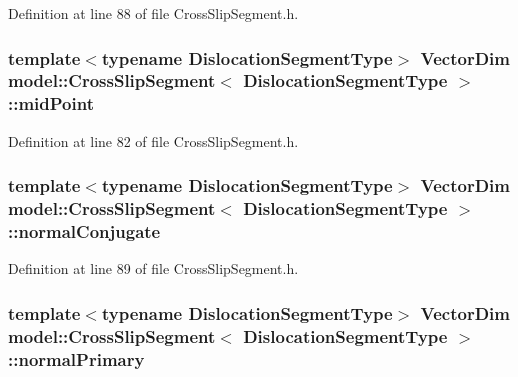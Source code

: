 Definition at line 88 of file Cross\+Slip\+Segment.\+h.

\hypertarget{classmodel_1_1_cross_slip_segment_a98b6008d9c15bff7cf37114bcd7e0379}{}
\subsubsection[{mid\+Point}]{\setlength{\rightskip}{0pt plus 5cm}template$<$typename Dislocation\+Segment\+Type$>$ Vector\+Dim {\bf model\+::\+Cross\+Slip\+Segment}$<$ Dislocation\+Segment\+Type $>$\+::mid\+Point}\label{classmodel_1_1_cross_slip_segment_a98b6008d9c15bff7cf37114bcd7e0379}


Definition at line 82 of file Cross\+Slip\+Segment.\+h.

\hypertarget{classmodel_1_1_cross_slip_segment_a831dece462b2badda4205a7f8b89a4ff}{}
\subsubsection[{normal\+Conjugate}]{\setlength{\rightskip}{0pt plus 5cm}template$<$typename Dislocation\+Segment\+Type$>$ Vector\+Dim {\bf model\+::\+Cross\+Slip\+Segment}$<$ Dislocation\+Segment\+Type $>$\+::normal\+Conjugate}\label{classmodel_1_1_cross_slip_segment_a831dece462b2badda4205a7f8b89a4ff}


Definition at line 89 of file Cross\+Slip\+Segment.\+h.

\hypertarget{classmodel_1_1_cross_slip_segment_a2373755ed86c97a3a9237878879f0122}{}
\subsubsection[{normal\+Primary}]{\setlength{\rightskip}{0pt plus 5cm}template$<$typename Dislocation\+Segment\+Type$>$ Vector\+Dim {\bf model\+::\+Cross\+Slip\+Segment}$<$ Dislocation\+Segment\+Type $>$\+::normal\+Primary}\label{classmodel_1_1_cross_slip_segment_a2373755ed86c97a3a9237878879f0122}


